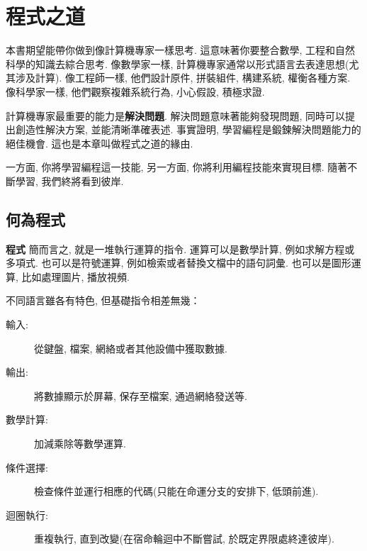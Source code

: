 \documentclass[10pt]{book}
\begin{document}
\begin{latexonly}

\tableofcontents

\clearemptydoublepage

\end{latexonly}

\mainmatter

\chapter{程式之道}

本書期望能帶你做到像計算機專家一樣思考. 
這意味著你要整合數學, 工程和自然科學的知識去綜合思考. 
像數學家一樣, 計算機專家通常以形式語言去表達思想(尤其涉及計算). 
像工程師一樣, 他們設計原件, 拼裝組件, 構建系統, 權衡各種方案. 
像科學家一樣, 他們觀察複雜系統行為, 小心假設, 積極求證. 

計算機專家最重要的能力是{\bf 解決問題}. 
解決問題意味著能夠發現問題, 同時可以提出創造性解決方案, 並能清晰準確表述. 
事實證明, 學習編程是鍛鍊解決問題能力的絕佳機會. 
這也是本章叫做程式之道的緣由. 
 
一方面, 你將學習編程這一技能, 另一方面, 你將利用編程技能來實現目標. 
隨著不斷學習, 我們終將看到彼岸. 

\section{何為程式}

{\bf 程式} 簡而言之, 就是一堆執行運算的指令. 
運算可以是數學計算, 例如求解方程或多項式. 
也可以是符號運算, 例如檢索或者替換文檔中的語句詞彙. 
也可以是圖形運算, 比如處理圖片, 播放視頻. 

不同語言雖各有特色, 但基礎指令相差無幾：

\begin{description}

\item[輸入:] 從鍵盤, 檔案, 網絡或者其他設備中獲取數據. 

\item[輸出:] 將數據顯示於屏幕, 保存至檔案, 通過網絡發送等. 

\item[數學計算:] 加減乘除等數學運算. 

\item[條件選擇:] 檢查條件並運行相應的代碼(只能在命運分支的安排下, 低頭前進). 

\item[迴圈執行:] 重複執行, 直到改變(在宿命輪迴中不斷嘗試, 於既定界限處終達彼岸). 

\end{description}
\end{document}
